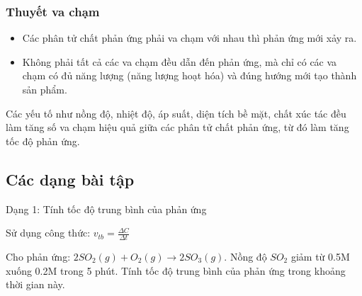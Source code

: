 \documentclass[Main.tex]{subfiles}
\begin{document}
\subsubsection{Thuyết va chạm}
    \begin{tomtat}
        \begin{itemize}
            \item Các phân tử chất phản ứng phải va chạm với nhau thì phản ứng mới xảy ra.
            \item Không phải tất cả các va chạm đều dẫn đến phản ứng, mà chỉ có các va chạm có đủ năng lượng (năng lượng hoạt hóa) và đúng hướng mới tạo thành sản phẩm.
        \end{itemize}
    \end{tomtat}
    \begin{hopdongian}
        Các yếu tố như nồng độ, nhiệt độ, áp suất, diện tích bề mặt, chất xúc tác đều làm tăng số va chạm hiệu quả giữa các phân tử chất phản ứng, từ đó làm tăng tốc độ phản ứng.
    \end{hopdongian}
\subsection{Các dạng bài tập}
\begin{dang}{Dạng 1: Tính tốc độ trung bình của phản ứng}
\end{dang}
\begin{phuongphap}
    Sử dụng công thức: $v_{tb} = \frac{\Delta C}{\Delta t}$
\end{phuongphap}
\begin{vd}
    Cho phản ứng: $2SO_2(g) + O_2(g) \rightarrow 2SO_3(g)$. Nồng độ $SO_2$ giảm từ 0.5M xuống 0.2M trong 5 phút. Tính tốc độ trung bình của phản ứng trong khoảng thời gian này.
	\loigiai{
        \[
            v_{tb} = \frac{0.5 - 0.2}{5} = 0.06 \text{ M/phút}
        \]
    }
\end{vd}
\end{document}
